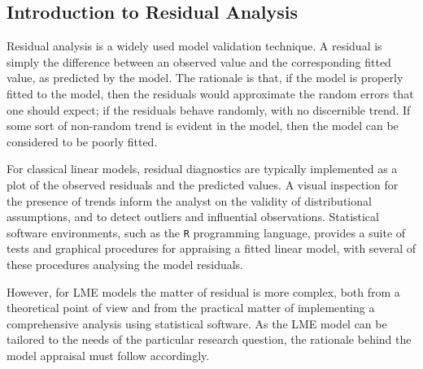 \documentclass[12pt, a4paper]{report}
\theoremstyle{plain}
\theoremstyle{definition}
\theoremstyle{remark}
\begin{document}
		\subsection{Introduction to Residual Analysis}
		Residual analysis is a widely used model validation technique. A residual is simply the difference between an observed value and the corresponding fitted value, as predicted by the model. The rationale is that, if the model is properly fitted to the model, then the residuals would approximate the random errors that one should expect; if the residuals behave randomly, with no discernible trend. If some sort of non-random trend is evident in the model, then the model can be considered to be poorly fitted.
		
		For classical linear models, residual diagnostics are typically implemented as a plot of the observed residuals and the predicted values. A visual inspection for the presence of trends inform the analyst on the validity of distributional assumptions, and to detect outliers and influential observations. Statistical software environments, such as the \texttt{R} programming language, provides a suite of tests and graphical procedures for appraising a fitted linear model, with several 
		of these procedures analysing the model residuals.
		
		However, for LME models the matter of residual is more complex, both from a theoretical point of view and from the practical matter of implementing a comprehensive analysis using statistical software. As the LME model can be tailored to the needs of the particular research question, the rationale behind the model appraisal must follow accordingly.
		
\end{document}

